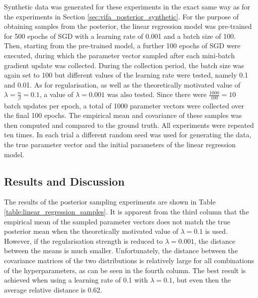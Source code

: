 \documentclass[msc,deptreport.inf]{infthesis} %
\begin{document}
Synthetic data was generated for these experiments in the exact same way as for the experiments in Section \ref{sec:vifa_posterior_synthetic}. For the purpose of obtaining samples from the posterior, the linear regression model was pre-trained for 500 epochs of SGD with a learning rate of 0.001 and a batch size of 100. Then, starting from the pre-trained model, a further 100 epochs of SGD were executed, during which the parameter vector sampled after each mini-batch gradient update was collected. During the collection period, the batch size was again set to 100 but different values of the learning rate were tested, namely 0.1 and 0.01. As for regularisation, as well as the theoretically motivated value of $\lambda = \frac{\alpha}{\beta} = 0.1$, a value of $\lambda = 0.001$ was also tested. Since there were $\frac{1000}{100} = 10$ batch updates per epoch, a total of 1000 parameter vectors were collected over the final 100 epochs. The empirical mean and covariance of these samples was then computed and compared to the ground truth. All experiments were repeated ten times. In each trial a different random seed was used for generating the data, the true parameter vector and the initial parameters of the linear regression model. 

\subsection{Results and Discussion}

The results of the posterior sampling experiments are shown in Table \ref{table:linear_regression_samples}. It is apparent from the third column that the empirical mean of the sampled parameter vectors does not match the true posterior mean when the theoretically motivated value of $\lambda = 0.1$ is used. However, if the regularisation strength is reduced to $\lambda = 0.001$, the distance between the means is much smaller. Unfortunately, the distance between the covariance matrices of the two distributions is relatively large for all combinations of the hyperparameters, as can be seen in the fourth column. The best result is achieved when using a learning rate of 0.1 with $\lambda = 0.1$, but even then the average relative distance is 0.62. 
\end{document}
